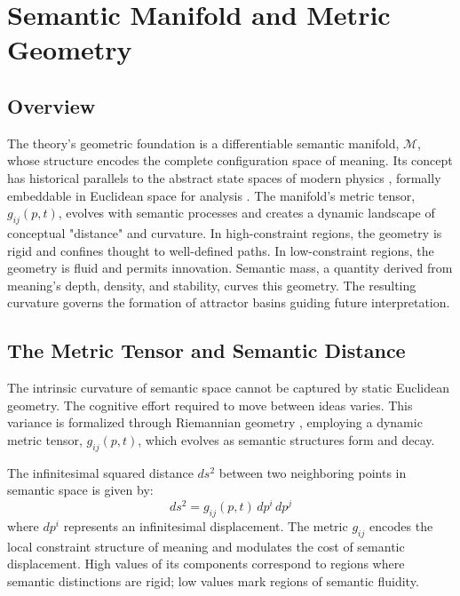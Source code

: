 \chapter{Semantic Manifold and Metric Geometry}

\section{Overview}

The theory's geometric foundation is a differentiable semantic manifold, \(\mathcal{M}\), whose structure encodes the complete configuration space of meaning. Its concept has historical parallels to the abstract state spaces of modern physics \autocite{vonNeumann1932}, formally embeddable in Euclidean space for analysis \autocite{Whitney1936}. The manifold's metric tensor, \(g_{ij}(p, t)\), evolves with semantic processes and creates a dynamic landscape of conceptual "distance" and curvature. In high-constraint regions, the geometry is rigid and confines thought to well-defined paths. In low-constraint regions, the geometry is fluid and permits innovation. Semantic mass, a quantity derived from meaning's depth, density, and stability, curves this geometry. The resulting curvature governs the formation of attractor basins guiding future interpretation.

\section{The Metric Tensor and Semantic Distance}

The intrinsic curvature of semantic space cannot be captured by static Euclidean geometry. The cognitive effort required to move between ideas varies. This variance is formalized through Riemannian geometry \autocite{Riemann1868, doCarmo1992}, employing a dynamic metric tensor, \(g_{ij}(p,t)\), which evolves as semantic structures form and decay.

The infinitesimal squared distance \(ds^2\) between two neighboring points in semantic space is given by:
\begin{equation}
ds^2 = g_{ij}(p, t) \, dp^i \, dp^j
\end{equation}
where \(dp^i\) represents an infinitesimal displacement. The metric \(g_{ij}\) encodes the local constraint structure of meaning and modulates the cost of semantic displacement. High values of its components correspond to regions where semantic distinctions are rigid; low values mark regions of semantic fluidity.

